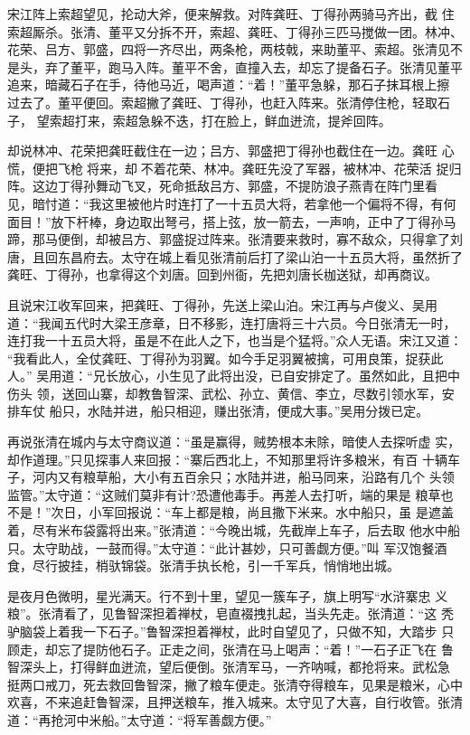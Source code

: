 宋江阵上索超望见，抡动大斧，便来解救。对阵龚旺、丁得孙两骑马齐出，截
住索超厮杀。张清、董平又分拆不开，索超、龚旺、丁得孙三匹马搅做一团。林冲、
花荣、吕方、郭盛，四将一齐尽出，两条枪，两枝戟，来助董平、索超。张清见不
是头，弃了董平，跑马入阵。董平不舍，直撞入去，却忘了提备石子。张清见董平
追来，暗藏石子在手，待他马近，喝声道：“着！”董平急躲，那石子抹耳根上擦
过去了。董平便回。索超撇了龚旺、丁得孙，也赶入阵来。张清停住枪，轻取石子，
望索超打来，索超急躲不迭，打在脸上，鲜血迸流，提斧回阵。

却说林冲、花荣把龚旺截住在一边；吕方、郭盛把丁得孙也截住在一边。龚旺
心慌，便把飞枪将来，却不着花荣、林冲。龚旺先没了军器，被林冲、花荣活
捉归阵。这边丁得孙舞动飞叉，死命抵敌吕方、郭盛，不提防浪子燕青在阵门里看
见，暗忖道：“我这里被他片时连打了一十五员大将，若拿他一个偏将不得，有何
面目！”放下杆棒，身边取出弩弓，搭上弦，放一箭去，一声响，正中了丁得孙马
蹄，那马便倒，却被吕方、郭盛捉过阵来。张清要来救时，寡不敌众，只得拿了刘
唐，且回东昌府去。太守在城上看见张清前后打了梁山泊一十五员大将，虽然折了
龚旺、丁得孙，也拿得这个刘唐。回到州衙，先把刘唐长枷送狱，却再商议。

且说宋江收军回来，把龚旺、丁得孙，先送上梁山泊。宋江再与卢俊义、吴用
道：“我闻五代时大梁王彦章，日不移影，连打唐将三十六员。今日张清无一时，
连打我一十五员大将，虽是不在此人之下，也当是个猛将。”众人无语。宋江又道：
“我看此人，全仗龚旺、丁得孙为羽翼。如今手足羽翼被擒，可用良策，捉获此人。”
吴用道：“兄长放心，小生见了此将出没，已自安排定了。虽然如此，且把中伤头
领，送回山寨，却教鲁智深、武松、孙立、黄信、李立，尽数引领水军，安排车仗
船只，水陆并进，船只相迎，赚出张清，便成大事。”吴用分拨已定。

再说张清在城内与太守商议道：“虽是赢得，贼势根本未除，暗使人去探听虚
实，却作道理。”只见探事人来回报：“寨后西北上，不知那里将许多粮米，有百
十辆车子，河内又有粮草船，大小有五百余只；水陆并进，船马同来，沿路有几个
头领监管。”太守道：“这贼们莫非有计?恐遭他毒手。再差人去打听，端的果是
粮草也不是！”次日，小军回报说：“车上都是粮，尚且撒下米来。水中船只，虽
是遮盖着，尽有米布袋露将出来。”张清道：“今晚出城，先截岸上车子，后去取
他水中船只。太守助战，一鼓而得。”太守道：“此计甚妙，只可善觑方便。”叫
军汉饱餐酒食，尽行披挂，梢驮锦袋。张清手执长枪，引一千军兵，悄悄地出城。

是夜月色微明，星光满天。行不到十里，望见一簇车子，旗上明写“水浒寨忠
义粮”。张清看了，见鲁智深担着禅杖，皂直裰拽扎起，当头先走。张清道：“这
秃驴脑袋上着我一下石子。”鲁智深担着禅杖，此时自望见了，只做不知，大踏步
只顾走，却忘了提防他石子。正走之间，张清在马上喝声：“着！”一石子正飞在
鲁智深头上，打得鲜血迸流，望后便倒。张清军马，一齐呐喊，都抢将来。武松急
挺两口戒刀，死去救回鲁智深，撇了粮车便走。张清夺得粮车，见果是粮米，心中
欢喜，不来追赶鲁智深，且押送粮车，推入城来。太守见了大喜，自行收管。张清
道：“再抢河中米船。”太守道：“将军善觑方便。”

